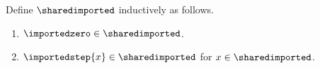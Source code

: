 

\begin{datatype}\label{shared_imported}
    Define $\sharedimported$ inductively as follows.
    \begin{enumerate}
        \item $\importedzero \in \sharedimported$.
        \item $\importedstep{x} \in \sharedimported$ for $x \in \sharedimported$.
    \end{enumerate}
\end{datatype}
